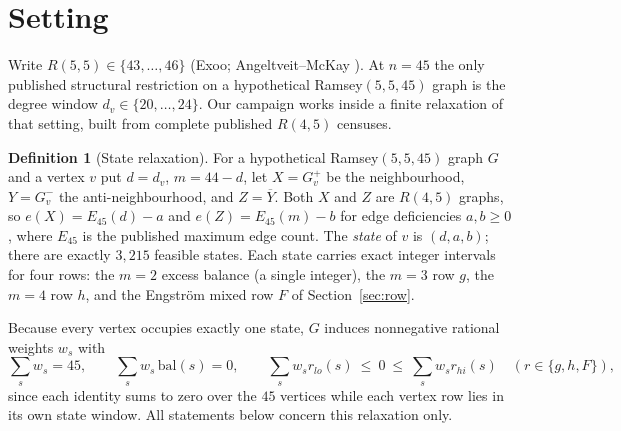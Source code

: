 \documentclass[11pt]{article}
\theoremstyle{definition}
\newtheorem{definition}[theorem]{Definition}
\newcommand{\Rams}{R}
\begin{document}
\begin{abstract}
Fifth, we therefore build the level-2 pair-coupled lift and close it too. With
adjacent and non-adjacent degree-pair variables, the per-degree-class
neighbour-degree identity and three exact codegree bounds, the optima move to
$360$, $41$, $45$: two routes unchanged, one improved by $1/349$. The
explanation is exact --- the campaign's $m=2$ row \emph{is} the degree-squared
identity $\sum_v\deg(v)^2=45e+\sum_v e(G[N(v)])-\sum_v e(G[D(v)])$ in disguise,
so every handshake-style repair was already present. Levels $1$ and $2$ of the
first exact basis at $n=45$ are thus both closed. We also record, with its
regression test, a near-miss row that is independent of the basis and appears to
cut hard but is unsound: exact certificates prove optimality for the programme
written, not soundness of the programme.
\end{abstract}

\section{Setting}

Write $\Rams(5,5)\in\{43,\dots,46\}$ (Exoo; Angeltveit--McKay
\cite{angeltveit2024}). At $n=45$ the only published structural restriction on a
hypothetical Ramsey$(5,5,45)$ graph is the degree window
$d_v\in\{20,\dots,24\}$. Our campaign works inside a finite relaxation of that
setting, built from complete published $\Rams(4,5)$ censuses.

\begin{definition}[State relaxation]\label{def:cone}
For a hypothetical Ramsey$(5,5,45)$ graph $G$ and a vertex $v$ put
$d=d_v$, $m=44-d$, let $X=G_v^{+}$ be the neighbourhood, $Y=G_v^{-}$ the
anti-neighbourhood, and $Z=\overline{Y}$. Both $X$ and $Z$ are
$\Rams(4,5)$ graphs, so $e(X)=E_{45}(d)-a$ and $e(Z)=E_{45}(m)-b$ for
edge deficiencies $a,b\ge0$, where $E_{45}$ is the published maximum edge count.
The \emph{state} of $v$ is $(d,a,b)$; there are exactly $3{,}215$ feasible
states. Each state carries exact integer intervals for four rows: the $m=2$
excess balance (a single integer), the $m=3$ row $g$, the $m=4$ row $h$, and the
Engstr\"om mixed row $F$ of Section~\ref{sec:row}.
\end{definition}

Because every vertex occupies exactly one state, $G$ induces nonnegative
rational weights $w_s$ with
\begin{equation}\label{eq:relax}
\sum_s w_s = 45,\qquad
\sum_s w_s\,\mathrm{bal}(s)=0,\qquad
\sum_s w_s r_{lo}(s)\ \le\ 0\ \le\ \sum_s w_s r_{hi}(s)
\quad (r\in\{g,h,F\}),
\end{equation}
since each identity sums to zero over the $45$ vertices while each vertex row
lies in its own state window. All statements below concern this relaxation only.
\end{document}
